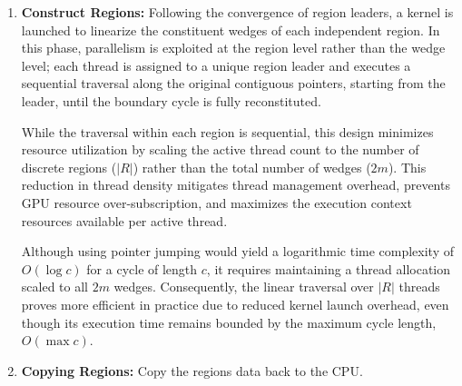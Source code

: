 \documentclass[conference]{IEEEtran}
\begin{document}
\begin{enumerate}
    \item \textbf{Construct Regions:} Following the convergence of region leaders, a kernel is launched to linearize the constituent wedges of each independent region. In this phase, parallelism is exploited at the region level rather than the wedge level; each thread is assigned to a unique region leader and executes a sequential traversal along the original contiguous pointers, starting from the leader, until the boundary cycle is fully reconstituted. 

    While the traversal within each region is sequential, this design minimizes resource utilization by scaling the active thread count to the number of discrete regions ($|R|$) rather than the total number of wedges ($2m$). This reduction in thread density mitigates thread management overhead, prevents GPU resource over-subscription, and maximizes the execution context resources available per active thread.
    
    Although using pointer jumping would yield a logarithmic time complexity of $O(\log c)$ for a cycle of length $c$, it requires maintaining a thread allocation scaled to all $2m$ wedges. Consequently, the linear traversal over $|R|$ threads proves more efficient in practice due to reduced kernel launch overhead, even though its execution time remains bounded by the maximum cycle length, $O(\max c)$.
    
    \item \textbf{Copying Regions:} Copy the regions data back to the CPU.
\end{enumerate}
\end{document}
